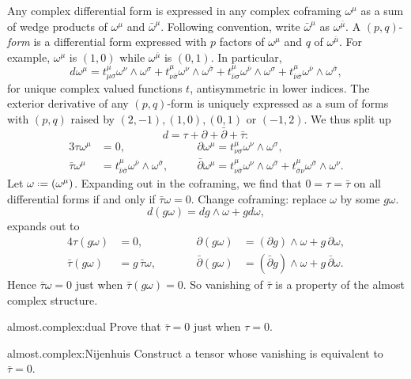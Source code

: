 Any complex differential form is expressed in any complex coframing \(\omega^{\mu}\) as a sum of wedge products of \(\omega^{\mu}\) and \(\bar\omega^{\mu}\). Following convention, write \(\bar\omega^{\mu}\) as \(\omega^{\bar{\mu}}\).
A \((p,q)\)-\emph{form} is a differential form expressed with \(p\) factors of \(\omega^{\mu}\) and \(q\) of \(\omega^{\bar{\mu}}\).
For example, \(\omega^{\mu}\) is \((1,0)\) while \(\omega^{\bar{\mu}}\) is \((0,1)\).
In particular,
\[
d\omega^{\mu}=%
t^{\mu}_{\mu\sigma}\omega^{\nu}\wedge\omega^{\sigma}+
t^{\mu}_{\nu\bar\sigma}\omega^{\nu}\wedge\omega^{\bar\sigma}+
t^{\mu}_{\bar\nu\sigma}\omega^{\bar\nu}\wedge\omega^{\sigma}+
t^{\mu}_{\bar\nu\bar\sigma}\omega^{\bar\nu}\wedge\omega^{\bar\sigma},
\]
for unique complex valued functions \(t\), antisymmetric in lower indices.
The exterior derivative of any \((p,q)\)-form is uniquely expressed as a sum of forms with \((p,q)\) raised by \((2,-1),(1,0),(0,1)\) or \((-1,2)\).
We thus split up
\[
d=\tau+\partial+\bar\partial+\bar\tau:
\]
\begin{alignat*}{3} 
\tau\omega^{\mu}
&=0,
\quad&&
\partial\omega^{\mu}
=t^{\mu}_{\nu\sigma}\omega^{\nu}\wedge\omega^{\sigma},\\
\bar\tau\omega^{\mu}
&=t^{\mu}_{\bar\nu\bar\sigma}\omega^{\bar\nu}\wedge\omega^{\bar\sigma},
\quad&&
\bar\partial\omega^{\mu}
=t^{\mu}_{\nu\bar\sigma}\omega^{\nu}\wedge\omega^{\bar\sigma}+
t^{\mu}_{\bar\sigma\nu}\omega^{\bar\sigma}\wedge\omega^{\nu}.
\end{alignat*}
Let \(\omega\defeq(\omega^{\mu})\).
Expanding out in the coframing, we find that \(0=\tau=\bar\tau\) on all differential forms if and only if \(\bar\tau\omega=0\).
Change coframing:  replace \(\omega\) by some \(g\omega\).
\[
d(g\omega)=dg\wedge\omega+gd\omega,
\]
expands out to
\begin{alignat*} {4}
\tau(g\omega)&=0,\qquad&&\partial(g\omega)&=(\partial g)\wedge\omega+g \, \partial\omega,\\
\bar\tau(g\omega)&=g\,\bar\tau\omega,\qquad&&\bar\partial(g\omega)&=(\bar\partial g)\wedge\omega+g \, \bar\partial\omega.
\end{alignat*}
Hence \(\bar\tau\omega=0\) just when \(\bar\tau(g\omega)=0\).
So vanishing of \(\bar\tau\) is a property of the almost complex structure.
\begin{problem}{almost.complex:dual}
Prove that \(\bar\tau=0\) just when \(\tau=0\).
\end{problem}
\begin{problem}{almost.complex:Nijenhuis}
Construct a tensor whose vanishing is equivalent to \(\bar\tau=0\).
\end{problem}
